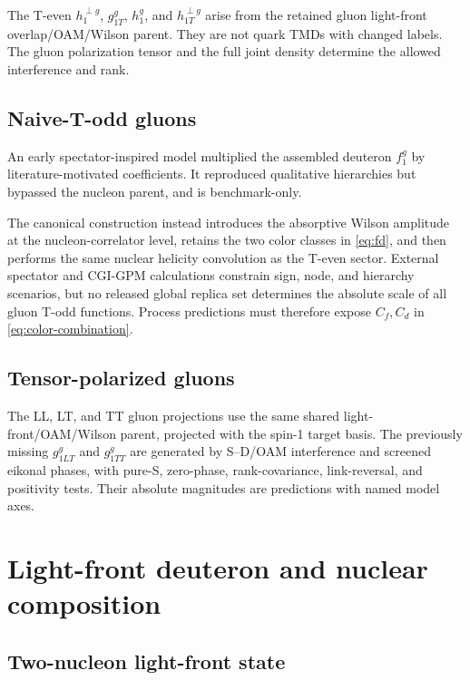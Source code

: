 \documentclass[11pt]{article}
\begin{document}
The T-even \(h_1^{\perp g}\), \(g_{1T}^g\), \(h_1^g\), and
\(h_{1T}^{\perp g}\) arise from the retained gluon light-front
overlap/OAM/Wilson parent.  They are not quark TMDs with changed labels.
The gluon polarization tensor and the full joint density determine the
allowed interference and rank.

\subsection{Naive-T-odd gluons}

An early spectator-inspired model multiplied the assembled deuteron
\(f_1^g\) by literature-motivated coefficients.  It reproduced qualitative
hierarchies but bypassed the nucleon parent, and is benchmark-only.

The canonical construction instead introduces the absorptive Wilson
amplitude at the nucleon-correlator level, retains the two color classes in
\cref{eq:fd}, and then performs the same nuclear helicity convolution as
the T-even sector.  External spectator and CGI-GPM calculations constrain
sign, node, and hierarchy scenarios, but no released global replica set
determines the absolute scale of all gluon T-odd functions.  Process
predictions must therefore expose \(C_f,C_d\) in
\cref{eq:color-combination}.

\subsection{Tensor-polarized gluons}

The LL, LT, and TT gluon projections use the same shared
light-front/OAM/Wilson parent, projected with the spin-1 target basis.
The previously missing \(g_{1LT}^g\) and \(g_{1TT}^g\) are generated by
S--D/OAM interference and screened eikonal phases, with pure-S,
zero-phase, rank-covariance, link-reversal, and positivity tests.  Their
absolute magnitudes are predictions with named model axes.

\section{Light-front deuteron and nuclear composition}
\label{sec:nuclear}

\subsection{Two-nucleon light-front state}
\end{document}
